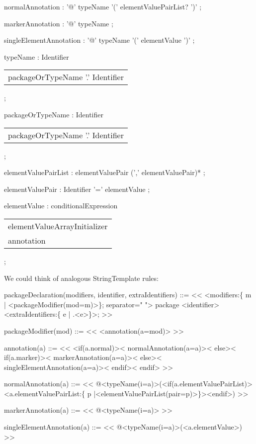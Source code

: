 \documentclass[11pt]{article}
\begin{document}
normalAnnotation
:        '@' typeName '(' elementValuePairList? ')'
;

markerAnnotation
:        '@' typeName
;

singleElementAnnotation
:        '@' typeName '(' elementValue ')'
;

typeName
:        Identifier
\begin{center}
\begin{tabular}{l}
packageOrTypeName '.' Identifier\\
\end{tabular}
\end{center}
;

packageOrTypeName
:        Identifier
\begin{center}
\begin{tabular}{l}
packageOrTypeName '.' Identifier\\
\end{tabular}
\end{center}
;

elementValuePairList
:        elementValuePair (',' elementValuePair)*
;

elementValuePair
:        Identifier '=' elementValue
;

elementValue
:        conditionalExpression
\begin{center}
\begin{tabular}{l}
elementValueArrayInitializer\\
annotation\\
\end{tabular}
\end{center}
;

We could think of analogous StringTemplate rules:

packageDeclaration(modifiers, identifier, extraIdentifiers) ::= <<
<modifiers:\{ m | <packageModifier(mod=m)>\}; separator=" "> package <identifier><extraIdentifiers:\{ e | .<e>\}>;
>>

packageModifier(mod) ::= <<
<annotation(a=mod)>
>>

annotation(a) ::= <<
<if(a.normal)><
  normalAnnotation(a=a)><
else><
  if(a.marker)><
    markerAnnotation(a=a)><
  else><
    singleElementAnnotation(a=a)><
  endif><
endif>
>>

normalAnnotation(a) ::= <<
@<typeName(i=a)>(<if(a.elementValuePairList)><a.elementValuePairList:\{ p |<elementValuePairList(pair=p)>\}><endif>)
>>

markerAnnotation(a) ::= <<
@<typeName(i=a)>
>>

singleElementAnnotation(a) ::= <<
@<typeName(i=a)>(<a.elementValue>)
>>
\end{document}
